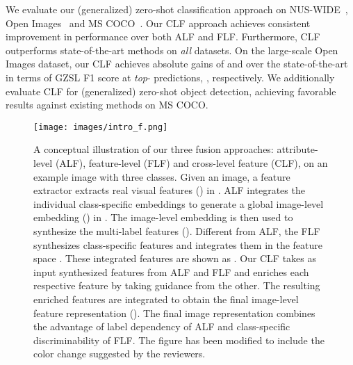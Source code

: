 \documentclass[10pt,journal,compsoc]{IEEEtran}
\begin{document}
We evaluate our (generalized) zero-shot classification approach on  NUS-WIDE~\cite{nuswide}, Open Images~\cite{openimages} and MS COCO~\cite{coco}. Our CLF approach achieves consistent improvement in performance over both ALF and FLF. Furthermore, CLF outperforms state-of-the-art methods on \textit{all} datasets. On the large-scale Open Images dataset, our CLF achieves absolute gains of  and  over the state-of-the-art in terms of GZSL F1 score at \textit{top}- predictions, , respectively.
We additionally evaluate CLF for (generalized) zero-shot object detection, achieving favorable results against existing methods on MS COCO.





\begin{figure}[t]
\centering
\texttt{[image: images/intro\_f.png]}
\caption{A conceptual illustration of our three fusion approaches: attribute-level (ALF), feature-level (FLF) and cross-level feature (CLF), on an example image with three classes. Given an image, a feature extractor   
extracts real visual features () in .
ALF integrates the individual class-specific embeddings to generate a global image-level embedding () in  . The image-level embedding is then used to synthesize the multi-label features (). Different from ALF, the FLF synthesizes class-specific features and integrates them in the feature space . These integrated features are shown as . Our CLF takes as input synthesized features from ALF and FLF and enriches each respective feature by taking guidance from the other. The resulting enriched features are integrated to obtain the final image-level feature representation (). The final image representation combines the advantage of label dependency of ALF and class-specific discriminability of FLF. The figure has been modified to include the color change suggested by the reviewers. 
\vspace{-0.1cm}
}
\label{fig:intro}
\end{figure}
\end{document}

